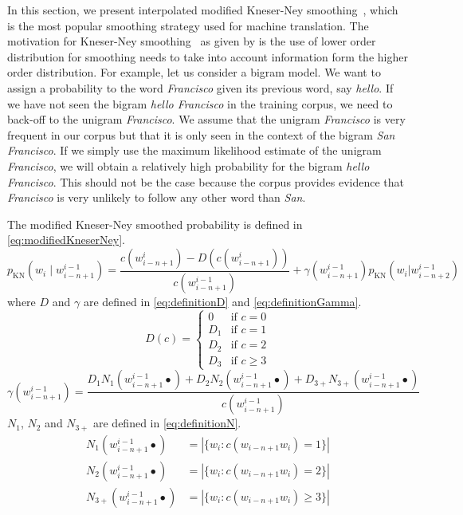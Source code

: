 In this section, we present interpolated modified Kneser-Ney
smoothing~\citep{chen-goodman:1998:harvard}, which is the most popular smoothing
strategy used for machine translation. The motivation for Kneser-Ney
smoothing~\citep{kneser-ney:1995:ICASSP} as given by
\citet{chen-goodman:1998:harvard} is the use of lower order distribution for
smoothing needs to take into account information form the higher order
distribution. For example, let us consider a bigram model. We want to assign a
probability to the word \emph{Francisco} given its previous word, say
\emph{hello}. If we have not seen the bigram \emph{hello Francisco} in the
training corpus, we need to back-off to the unigram \emph{Francisco}. We assume
that the unigram \emph{Francisco} is very frequent in our corpus but that it
is only seen in the context of the bigram \emph{San Francisco}. If we simply
use the maximum likelihood estimate of the unigram \emph{Francisco}, we will
obtain a relatively high probability for the bigram \emph{hello Francisco}. This
should not be the case because the corpus provides evidence that
\emph{Francisco} is very unlikely to follow any other word than \emph{San}.

The modified Kneser-Ney smoothed probability is defined in
\autoref{eq:modifiedKneserNey}.
%
\begin{equation}
  p_{\text{KN}}(w_i \mid w_{i - n + 1}^{i - 1}) = \frac{c(w_{i - n + 1}^i) - D(c(w_{i - n + 1}^i))}{c(w_{i - n + 1}^{i - 1})} + \gamma(w_{i - n + 1}^{i - 1}) p_{\text{KN}}(w_i | w_{i - n + 2}^{i - 1})
  \label{eq:modifiedKneserNey}
\end{equation}
%
where $D$ and $\gamma$ are defined in \autoref{eq:definitionD} and
\autoref{eq:definitionGamma}.
%
\begin{equation}
  D(c) =
  \begin{cases}
    0 & \text{if } c = 0 \\
    D_1 & \text{if } c = 1 \\
    D_2 & \text{if } c = 2 \\
    D_3 & \text{if } c \geq 3
  \end{cases}
  \label{eq:definitionD}
\end{equation}
%
\begin{equation}
  \gamma(w_{i - n + 1}^{i - 1}) = \frac{D_1 N_1(w_{i - n + 1}^{i - 1} \bullet) + D_2 N_2(w_{i - n + 1}^{i - 1} \bullet) + D_{3+} N_{3+}(w_{i - n + 1}^{i - 1} \bullet)}{c(w_{i - n + 1}^{i - 1})}
  \label{eq:definitionGamma}
\end{equation}
%
$N_1$, $N_2$ and $N_{3+}$ are defined in \autoref{eq:definitionN}.
%
\begin{equation}
  \begin{split}
    N_1(w_{i - n + 1}^{i - 1} \bullet) &= |\{w_i: c(w_{i - n + 1} w_i) = 1 \}| \\
    N_2(w_{i - n + 1}^{i - 1} \bullet) &= |\{w_i: c(w_{i - n + 1} w_i) = 2 \}| \\
    N_{3+}(w_{i - n + 1}^{i - 1} \bullet) &= |\{w_i: c(w_{i - n + 1} w_i) \geq 3 \}|
  \end{split}
  \label{eq:definitionN}
\end{equation}

